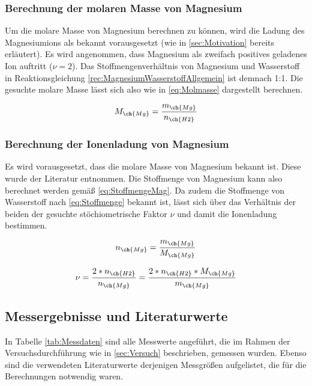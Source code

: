 \documentclass{article}
\begin{document}
      \subsubsection{Berechnung der molaren Masse von Magnesium}
    
        Um die molare Masse von Magnesium berechnen zu können, wird die Ladung des Magnesiumions als bekannt vorausgesetzt (wie in \ref{sec:Motivation} bereits erläutert). Es wird angenommen, dass Magnesium als zweifach positives geladenes Ion auftritt ($\nu = 2$). Das Stoffmengenverhältnis von Magnesium und Wasserstoff in Reaktionsgleichung \ref{rec:MagnesiumWasserstoffAllgemein} ist demnach 1:1. Die gesuchte molare Masse lässt sich also wie in \eqref{eq:Molmasse} dargestellt berechnen.
    
        \begin{equation}
          M_{\ch{Mg}} = \frac{m_{\ch{Mg}}}{n_{\ch{H2}}} \label{eq:Molmasse}
        \end{equation}
    
      \subsubsection{Berechnung der Ionenladung von Magnesium}
    
        Es wird vorausgesetzt, dass die molare Masse von Magnesium bekannt ist. Diese wurde der Literatur entnommen. Die Stoffmenge von Magnesium kann also berechnet werden gemäß \eqref{eq:StoffmengeMag}. Da zudem die Stoffmenge von Wasserstoff nach \eqref{eq:Stoffmenge} bekannt ist, lässt sich über das Verhältnis der beiden der gesuchte stöchiometrische Faktor $\nu$ und damit die Ionenladung bestimmen.
    
        \begin{equation}
          n_{\ch{Mg}} = \frac{m_{\ch{Mg}}}{M_{\ch{Mg}}} \label{eq:StoffmengeMag} 
        \end{equation}
    
        \begin{equation}
          \nu = \frac{2*n_{\ch{H2}}}{n_{\ch{Mg}}} = \frac{2*n_{\ch{H2}}*M_{\ch{Mg}}}{m_{\ch{Mg}}} \label{eq:nu}
        \end{equation}
      
    \subsection{Messergebnisse und Literaturwerte}
    
      In Tabelle \ref{tab:Messdaten} sind alle Messwerte angeführt, die im Rahmen der Versuchsdurchführung wie in \ref{sec:Versuch} beschrieben, gemessen wurden. Ebenso sind die verwendeten Literaturwerte derjenigen Messgrößen aufgelistet, die für die Berechnungen notwendig waren.
      
\end{document}
